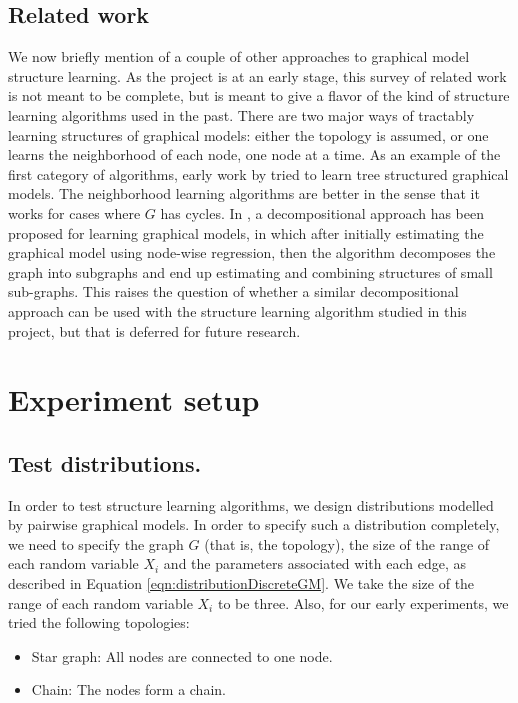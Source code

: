 \documentclass{article}
\begin{document}
\subsection{Related work}
We now briefly mention of a couple of other approaches to graphical model structure learning. As the project is at an early stage, this survey of related work is not meant to be complete, but is meant to give a flavor of the kind of structure learning algorithms used in the past. There are two major ways of tractably learning structures of graphical models: either the topology is assumed, or one learns the neighborhood of each node, one node at a time. As an example of the first category of algorithms, early work by \citet{Chow68approximatingdiscrete} tried to learn tree structured graphical models. The neighborhood learning algorithms are better in the sense that it works for cases where $G$ has cycles. In \citet{dahindenContingency09}, a decompositional approach has been proposed for learning graphical models, in which after initially estimating the graphical model using node-wise regression, then the algorithm decomposes the graph into subgraphs and end up estimating and combining structures of small sub-graphs. This raises the question of whether a similar decompositional approach can be used with the structure learning algorithm studied in this project, but that is deferred for future research.


\section{Experiment setup}
\label{sec:Experiment setup}

\subsection{Test distributions.}
\label{Test distributions.}
In order to test structure learning algorithms, we design distributions modelled by pairwise graphical models. In order to specify such a distribution completely, we need to specify the graph $G$ (that is, the topology), the size of the range of each random variable $X_i$ and the parameters associated with each edge, as described in Equation \ref{eqn:distributionDiscreteGM}. We take the size of the range of each random variable $X_i$ to be three. Also, for our early experiments, we tried the following topologies:
\begin{itemize}
 \item Star graph: All nodes are connected to one node.
 \item Chain: The nodes form a chain.
\end{itemize}
\end{document}
